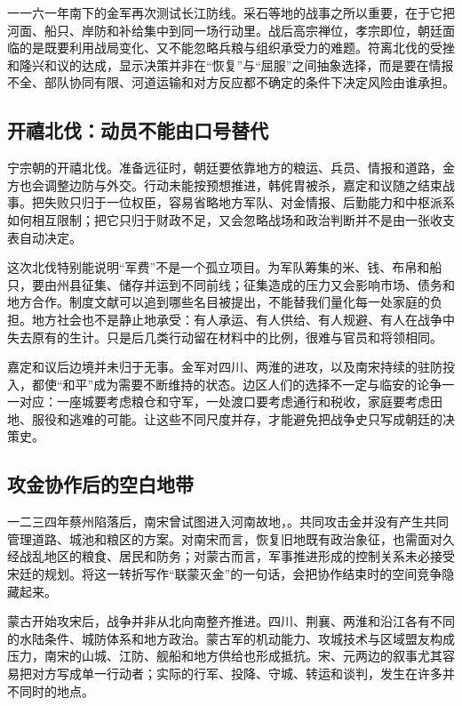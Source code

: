 一一六一年南下的金军再次测试长江防线。采石等地的战事之所以重要，在于它把河面、船只、岸防和补给集中到同一场行动里。战后高宗禅位，孝宗即位，朝廷面临的是既要利用战局变化、又不能忽略兵粮与组织承受力的难题。符离北伐的受挫和隆兴和议的达成，显示决策并非在“恢复”与“屈服”之间抽象选择，而是要在情报不全、部队协同有限、河道运输和对方反应都不确定的条件下决定风险由谁承担。

\subsection{开禧北伐：动员不能由口号替代}

宁宗朝的开禧北伐。准备远征时，朝廷要依靠地方的粮运、兵员、情报和道路，金方也会调整边防与外交。行动未能按预想推进，韩侂胄被杀，嘉定和议随之结束战事。把失败只归于一位权臣，容易省略地方军队、对金情报、后勤能力和中枢派系如何相互限制；把它只归于财政不足，又会忽略战场和政治判断并不是由一张收支表自动决定。

这次北伐特别能说明“军费”不是一个孤立项目。为军队筹集的米、钱、布帛和船只，要由州县征集、储存并运到不同前线；征集造成的压力又会影响市场、债务和地方合作。制度文献可以追到哪些名目被提出，不能替我们量化每一处家庭的负担。地方社会也不是静止地承受：有人承运、有人供给、有人规避、有人在战争中失去原有的生计。只是后几类行动留在材料中的比例，很难与官员和将领相同。

嘉定和议后边境并未归于无事。金军对四川、两淮的进攻，以及南宋持续的驻防投入，都使“和平”成为需要不断维持的状态。边区人们的选择不一定与临安的论争一一对应：一座城要考虑粮仓和守军，一处渡口要考虑通行和税收，家庭要考虑田地、服役和逃难的可能。让这些不同尺度并存，才能避免把战争史只写成朝廷的决策史。

\subsection{攻金协作后的空白地带}

一二三四年蔡州陷落后，南宋曾试图进入河南故地，。共同攻击金并没有产生共同管理道路、城池和粮区的方案。对南宋而言，恢复旧地既有政治象征，也需面对久经战乱地区的粮食、居民和防务；对蒙古而言，军事推进形成的控制关系未必接受宋廷的规划。将这一转折写作“联蒙灭金”的一句话，会把协作结束时的空间竞争隐藏起来。

蒙古开始攻宋后，战争并非从北向南整齐推进。四川、荆襄、两淮和沿江各有不同的水陆条件、城防体系和地方政治。蒙古军的机动能力、攻城技术与区域盟友构成压力，南宋的山城、江防、舰船和地方供给也形成抵抗。宋、元两边的叙事尤其容易把对方写成单一行动者；实际的行军、投降、守城、转运和谈判，发生在许多并不同时的地点。

